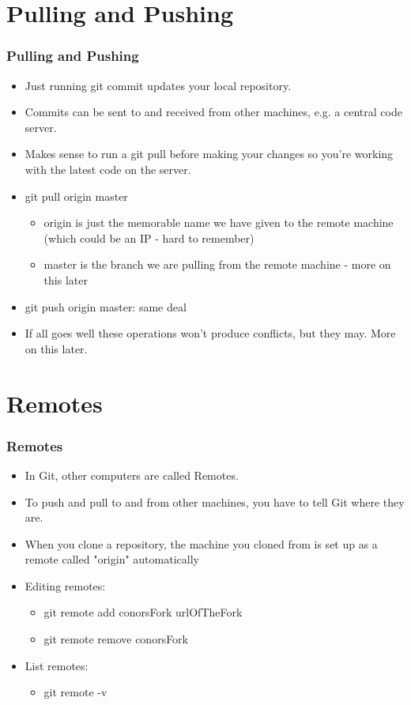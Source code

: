 \documentclass{beamer}
\begin{document}
\section{Pulling and Pushing}
\begin{frame}
\frametitle{Pulling and Pushing}
\begin{itemize}
\pause
\item Just running git commit updates your local repository.
\pause
\item Commits can be sent to and received from other machines, e.g. a central
code server.
\pause
\item Makes sense to run a git pull before making your changes so you're working
with the latest code on the server.
\pause
\item git pull origin master
	\begin{itemize}
	\pause
	\item origin is just the memorable name we have given to the remote
machine (which could be an IP - hard to remember)
	\pause
	\item master is the branch we are pulling from the remote machine - more
on this later
	\end{itemize}
\pause
\item git push origin master: same deal
\pause
\item If all goes well these operations won't produce conflicts, but they may.
More on this later.
\end{itemize}
\end{frame}


\section{Remotes}
\begin{frame}
\frametitle{Remotes}
\begin{itemize}
\pause
\item In Git, other computers are called Remotes.
\pause
\item To push and pull to and from other machines, you have to tell Git where
they are.
\pause
\item When you clone a repository, the machine you cloned from is set up as a
remote called "origin" automatically
\pause
\item Editing remotes:
\pause
	\begin{itemize}
	\item git remote add conorsFork urlOfTheFork
	\pause
	\item git remote remove conorsFork
	\end{itemize}
\pause
\item List remotes:
	\begin{itemize}
	\pause
	\item git remote -v
	\end{itemize}
\end{itemize}
\end{frame}
\end{document}
